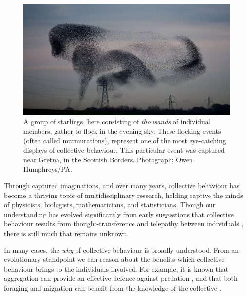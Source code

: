 \begin{figure}[t]
  \includegraphics[width=\textwidth]{murmuration.jpg}
  \caption{A group of starlings, here consisting of \emph{thousands} of
    individual members, gather to flock in the evening sky. These flocking
    events (often called murmurations), represent one of the most
    eye-catching displays of collective behaviour. This particular event
    was captured near Gretna, in the Scottish Borders. Photograph: Owen
    Humphreys/PA.}
  \label{fig:murmuration}
\end{figure}

Through captured imaginations, and over many years, collective behaviour has
become a thriving topic of multidisciplinary research, holding captive the
minds of physicists, biologists, mathematicians, and statisticians. Though our
understanding has evolved significantly from early suggestions that collective
behaviour results from thought-transference and telepathy between individuals
\parencite{selous31}, there is still much that remains unknown.

In many cases, the \emph{why} of collective behaviour is broadly understood.
From an evolutionary standpoint we can reason about the benefits which
collective behaviour brings to the individuals involved. For example, it is
known that aggregation can provide an effective defence against predation
\parencite{landeau86}, and that both foraging and migration can benefit from
the knowledge of the collective \parencite{simmons04}.

